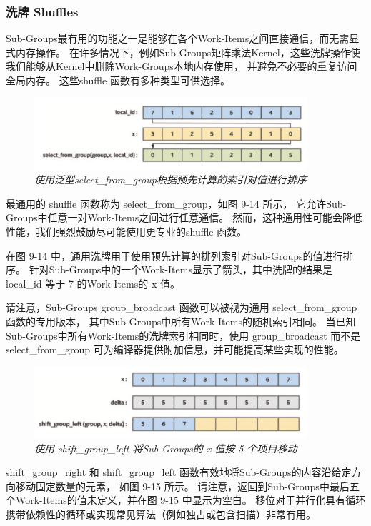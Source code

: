 \subsubsection{洗牌 Shuffles}
Sub-Groups最有用的功能之一是能够在各个Work-Items之间直接通信，而无需显式内存操作。 
在许多情况下，例如Sub-Groups矩阵乘法Kernel，这些洗牌操作使我们能够从Kernel中删除Work-Groups本地内存使用，
并避免不必要的重复访问全局内存。 这些shuffle 函数有多种类型可供选择。

\begin{figure}[H]
	\centering
	\includegraphics[width=0.9\textwidth]{figs/F9.14.png}
	\caption{\textit{使用泛型select\_from\_group根据预先计算的索引对值进行排序 }}
\end{figure}

最通用的 shuffle 函数称为 select\_from\_group，如图 9-14 所示，
它允许Sub-Groups中任意一对Work-Items之间进行任意通信。 
然而，这种通用性可能会降低性能，我们强烈鼓励尽可能使用更专业的shuffle 函数。

在图 9-14 中，通用洗牌用于使用预先计算的排列索引对Sub-Groups的值进行排序。 
针对Sub-Groups中的一个Work-Items显示了箭头，其中洗牌的结果是 local\_id 等于 7 的Work-Items的 x 值。

请注意，Sub-Groups group\_broadcast 函数可以被视为通用 select\_from\_group 函数的专用版本，
其中Sub-Groups中所有Work-Items的随机索引相同。 
当已知Sub-Groups中所有Work-Items的洗牌索引相同时，使用 group\_broadcast 
而不是 select\_from\_group 可为编译器提供附加信息，并可能提高某些实现的性能。

\begin{figure}[H]
	\centering
	\includegraphics[width=0.9\textwidth]{figs/F9.15.png}
	\caption{\textit{使用 shift\_group\_left 将Sub-Groups的 x 值按 5 个项目移动 }}
\end{figure}

shift\_group\_right 和 shift\_group\_left 函数有效地将Sub-Groups的内容沿给定方向移动固定数量的元素，
如图 9-15 所示。 请注意，返回到Sub-Groups中最后五个Work-Items的值未定义，并在图 9-15 中显示为空白。 
移位对于并行化具有循环携带依赖性的循环或实现常见算法（例如独占或包含扫描）非常有用。

